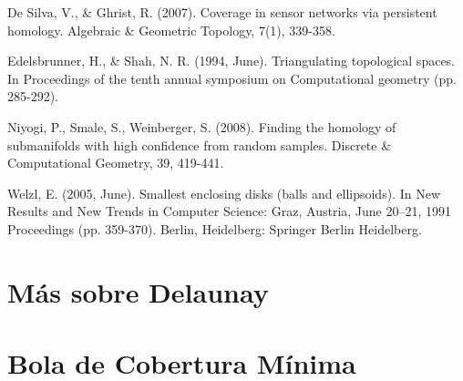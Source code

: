 \documentclass[legalpaper,12pt]{article}
\begin{document}
\begin{thebibliography}{9}
De Silva, V., \& Ghrist, R. (2007). Coverage in sensor networks via persistent homology. Algebraic \& Geometric Topology, 7(1), 339-358.

Edelsbrunner, H., \& Shah, N. R. (1994, June). Triangulating topological spaces. In Proceedings of the tenth annual symposium on Computational geometry (pp. 285-292).

Niyogi, P., Smale, S., Weinberger, S. (2008). Finding the homology of submanifolds with high confidence from random samples. Discrete \& Computational Geometry, 39, 419-441.

Welzl, E. (2005, June). Smallest enclosing disks (balls and ellipsoids). In New Results and New Trends in Computer Science: Graz, Austria, June 20–21, 1991 Proceedings (pp. 359-370). Berlin, Heidelberg: Springer Berlin Heidelberg.

\end{thebibliography}

\appendix

\section{Más sobre Delaunay}

\section{Bola de Cobertura Mínima}
\end{document}
